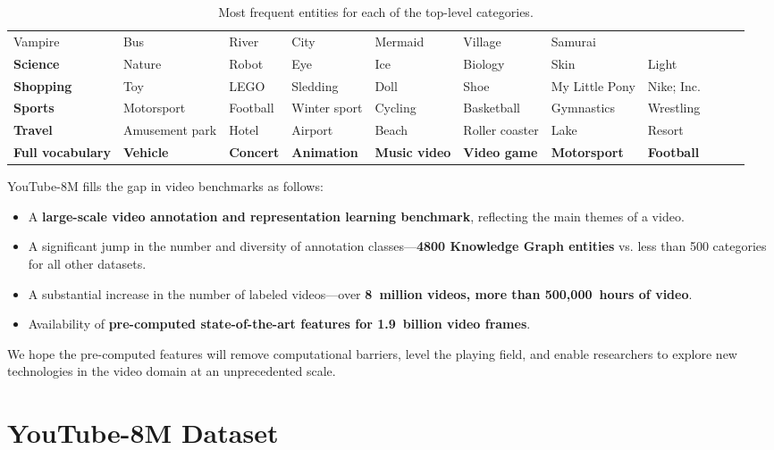 \documentclass{sig-alternate-05-2015}
\begin{document}
\begin{table*}
{\begin{tabular}{|l|l|l|l|l|l|l|l|l|l|l|}
Vampire & Bus & River & City & Mermaid & Village & Samurai \\\bf{Science} & Nature & Robot & Eye & Ice & Biology & Skin & Light \\\bf{Shopping} & Toy & LEGO & Sledding & Doll & Shoe & My Little Pony & Nike; Inc. \\\bf{Sports} & Motorsport & Football & Winter sport & Cycling & Basketball & Gymnastics & Wrestling \\\bf{Travel} & Amusement park & Hotel & Airport & Beach & Roller coaster & Lake & Resort \\\hline \bf{Full vocabulary} & \bf{Vehicle} & \bf{Concert} & \bf{Animation} &\bf{ Music video} &\bf{ Video game} & \bf{Motorsport} & \bf{Football} \\\hline
\end{tabular}
}
\caption{Most frequent entities for each of the top-level categories.}
\label{table:verticals-top-entities}
\end{table*}

 
YouTube-8M fills the gap in video benchmarks as follows:
\begin{itemize} \setlength\itemsep{0em}
  \item A \textbf{large-scale video annotation and representation learning benchmark}, reflecting the main themes of a video.\item A significant jump in the number and diversity of annotation classes---\textbf{4800 Knowledge Graph entities} vs. less than 500 categories for all other datasets.
  \item A substantial increase in the number of labeled videos---over \textbf{8~million videos, more than 500,000~hours of video}.
  \item Availability of \textbf{pre-computed state-of-the-art features for 1.9~billion video frames}.
\end{itemize}
 We hope the pre-computed features will remove computational barriers, level the playing field, and enable researchers to explore new technologies in the video domain at an unprecedented scale.

 
\section{YouTube-8M Dataset}
\label{sec:dataset}
\end{document}
